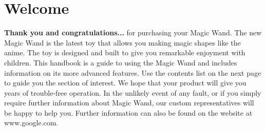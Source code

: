 %

%
%


\chapter{Welcome}

\textbf{{\Large Thank you and congratulations...}}
for purchasing your Magic Wand.
The new Magic Wand is the latest toy that allows you making magic shapes like the anime. The toy is designed and built to give you remarkable enjoyment with children.
This handbook is a guide to using the Magic Wand and includes information on its more advanced features. Use the contents list on the next page to guide you the section of interest.
We hope that your product will give you years of trouble-free operation. In the unlikely event of any fault, or if you
simply require further information about Magic Wand, our custom representatives will be happy to help you. Further
information can also be found on the website at www.google.com.

\bigskip

\textbf{}